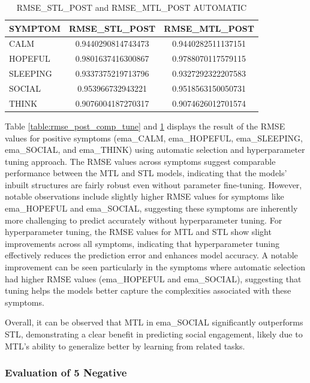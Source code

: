 \begin{table}[H]
\centering
\caption{RMSE\_STL\_POST and RMSE\_MTL\_POST AUTOMATIC }
\label{table:rmse_post_compP_auto}
\begin{tabular}{|l|c|c|}
\hline
\textbf{SYMPTOM} & \textbf{RMSE\_STL\_POST} & \textbf{RMSE\_MTL\_POST} \\ \hline
CALM & 0.9440290814743473 & 0.9440282511137151 \\ \hline
HOPEFUL & 0.9801637416300867 & 0.9788070117579115 \\ \hline
SLEEPING & 0.9337375219713796 & 0.9327292322207583 \\ \hline
SOCIAL & 0.953966732943221 & 0.9518563150050731 \\ \hline
THINK & 0.9076004187270317 & 0.9074626012701574 \\ \hline
\end{tabular}
\end{table}



Table \ref{table:rmse_post_comp_tune} and \ref{table:rmse_post_compP_auto} displays the result of the RMSE values for positive symptoms (ema\_CALM, ema\_HOPEFUL, ema\_SLEEPING, ema\_SOCIAL, and ema\_THINK) using automatic selection and hyperparameter tuning approach. The RMSE values across symptoms suggest comparable performance between the MTL and STL models, indicating that the models’ inbuilt structures are fairly robust even without parameter fine-tuning. However, notable observations include slightly higher RMSE values for symptoms like ema\_HOPEFUL and ema\_SOCIAL, suggesting these symptoms are inherently more challenging to predict accurately without hyperparameter tuning.
For hyperparameter tuning, the RMSE values for MTL and STL show slight improvements across all symptoms, indicating that hyperparameter tuning effectively reduces the prediction error and enhances model accuracy.
A notable improvement can be seen particularly in the symptoms where automatic selection had higher RMSE values (ema\_HOPEFUL and ema\_SOCIAL), suggesting that tuning helps the models better capture the complexities associated with these symptoms.

Overall, it can be observed that MTL in ema\_SOCIAL significantly outperforms STL, demonstrating a clear benefit in predicting social engagement, likely due to MTL’s ability to generalize better by learning from related tasks.

\subsubsection{Evaluation of 5 Negative}

